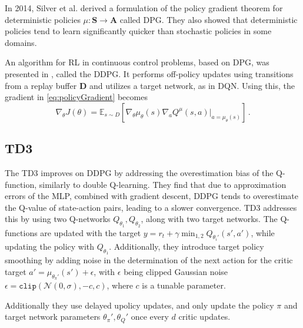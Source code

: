 \documentclass{article}
\newcommand{\set}[1]{\boldsymbol{#1}}
\newcommand{\policy}{\pi}
\newcommand{\detpol}{\mu}
\newcommand{\expectation}{\mathbb{E}}
\newcommand{\param}{\theta}
\newcommand{\objective}{J}
\newcommand{\action}{a}
\newcommand{\state}{s}
\newcommand{\replayBuffer}{\set{D}}
\newcommand{\decay}{\gamma}
\newcommand{\stateSet}{\set{S}}
\newcommand{\actionSet}{\set{A}}
\begin{document}
In 2014, Silver et al. \cite{Silver2014} derived a formulation of the policy gradient theorem for deterministic policies $\detpol : \stateSet \to \actionSet$ called \gls*{DPG}. They also showed that deterministic policies tend to learn significantly quicker than stochastic policies in some domains.

An algorithm for \gls*{RL} in continuous control problems, based on \gls*{DPG}, was presented in \cite{Lillicrap2016}, called the \gls*{DDPG}. It performs off-policy updates using transitions from a replay buffer $\replayBuffer$ and utilizes a target network, as in \gls*{DQN}.
Using this, the gradient in \eqref{eq:policyGradient} becomes
\begin{equation}
\nabla_\param\objective(\param) = \expectation_{s\sim D}
\left[\nabla_\param\detpol_\param(\state)\nabla_\action Q^\detpol(\state,\action)|_{\action=\detpol_\param(\state)}\right] \,.
\label{eq:DDPG}
\end{equation}
\subsection{TD3}
The \gls*{TD3} \cite{Fujimoto2018}  improves on \gls*{DDPG} by addressing the overestimation bias of the Q-function, similarly to double Q-learning.
They find that due to approximation errors of the \gls*{MLP}, combined with gradient descent, \gls*{DDPG} tends to overestimate the Q-value of state-action pairs, leading to a slower convergence.
\gls*{TD3} addresses this by using two Q-networks $Q_{\param_1},Q_{\param_2}$, along with two target networks. 
The Q-functions are updated with the target $y=r_t + \decay \min_{1,2} Q_{\param_i'}(\state',\action')$, while updating the policy with $Q_{\param_1}$.
Additionally, they introduce target policy smoothing by adding noise in the determination of the next action for the critic target $\action' = \detpol_{\param_\policy'}(\state') + \epsilon$, with $\epsilon$ being clipped Gaussian noise $\epsilon = \mathtt{clip} (\mathcal{N}(0,\sigma),-c,c)$, where $c$ is a tunable parameter.

Additionally they use delayed upolicy updates, and only update the policy $\pi$ and target network parameters $\theta_\policy', \theta_Q'$ once every $d$ critic updates.
\end{document}
